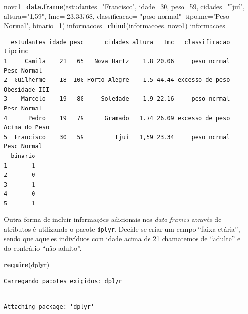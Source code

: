 \documentclass[12pt,brazil,oneside]{book}
\newenvironment{Shaded}{\begin{snugshade}}{\end{snugshade}}
\newcommand{\DataTypeTok}[1]{\textcolor[rgb]{0.13,0.29,0.53}{#1}}
\newcommand{\DecValTok}[1]{\textcolor[rgb]{0.00,0.00,0.81}{#1}}
\newcommand{\FloatTok}[1]{\textcolor[rgb]{0.00,0.00,0.81}{#1}}
\newcommand{\KeywordTok}[1]{\textcolor[rgb]{0.13,0.29,0.53}{\textbf{#1}}}
\newcommand{\NormalTok}[1]{#1}
\newcommand{\StringTok}[1]{\textcolor[rgb]{0.31,0.60,0.02}{#1}}
\begin{document}
\begin{Shaded}
\begin{Highlighting}[]
\NormalTok{novo1=}\KeywordTok{data.frame}\NormalTok{(}\DataTypeTok{estudantes=}\StringTok{"Francisco"}\NormalTok{, }\DataTypeTok{idade=}\DecValTok{30}\NormalTok{, }\DataTypeTok{peso=}\DecValTok{59}\NormalTok{, }
                 \DataTypeTok{cidades=}\StringTok{"Ijuí"}\NormalTok{, }
                 \DataTypeTok{altura=}\StringTok{"1,59"}\NormalTok{, }
                 \DataTypeTok{Imc=} \FloatTok{23.33768}\NormalTok{, }
                 \DataTypeTok{classificacao=} \StringTok{"peso normal"}\NormalTok{,}
                 \DataTypeTok{tipoimc=}\StringTok{"Peso Normal"}\NormalTok{, }
                 \DataTypeTok{binario=}\DecValTok{1}\NormalTok{)}
\NormalTok{informacoes=}\KeywordTok{rbind}\NormalTok{(informacoes, novo1)}
\NormalTok{informacoes}
\end{Highlighting}
\end{Shaded}

\begin{verbatim}
  estudantes idade peso      cidades altura   Imc   classificacao       tipoimc
1     Camila    21   65   Nova Hartz    1.8 20.06     peso normal   Peso Normal
2  Guilherme    18  100 Porto Alegre    1.5 44.44 excesso de peso Obesidade III
3    Marcelo    19   80     Soledade    1.9 22.16     peso normal   Peso Normal
4      Pedro    19   79      Gramado   1.74 26.09 excesso de peso Acima do Peso
5  Francisco    30   59         Ijuí   1,59 23.34     peso normal   Peso Normal
  binario
1       1
2       0
3       1
4       0
5       1
\end{verbatim}

Outra forma de incluir informações adicionais nos \emph{data frames}
através de atributos é utilizando o pacote \texttt{dplyr}. Decide-se
criar um campo ``faixa etária'', sendo que aqueles indivíduos com idade
acima de 21 chamaremos de ``adulto'' e do contrário ``não adulto''.

\begin{Shaded}
\begin{Highlighting}[]
\KeywordTok{require}\NormalTok{(dplyr)}
\end{Highlighting}
\end{Shaded}

\begin{verbatim}
Carregando pacotes exigidos: dplyr
\end{verbatim}

\begin{verbatim}

Attaching package: 'dplyr'
\end{verbatim}
\end{document}

